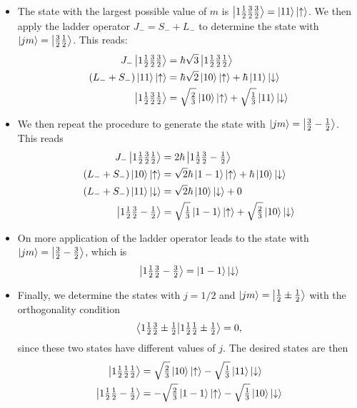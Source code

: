 \documentclass[11pt, a4paper]{article}
\newcommand{\ua}{\uparrow}  %
\newcommand{\da}{\downarrow}  %
\begin{document}
\begin{itemize}
    \item The state with the largest possible value of $ m $ is $ \ket{1 \tfrac{1}{2} \tfrac{3}{2} \tfrac{3}{2}} = \ket{11}\ket{\ua} $. We then apply the ladder operator $ J_{-} = S_{-} + L_{-} $ to determine the state with $ \ket{jm} = \ket{\tfrac{3}{2}\tfrac{1}{2}} $. This reads:
    \begin{align*}
        J_{-} \ket{1 \tfrac{1}{2} \tfrac{3}{2}\tfrac{3}{2}} &= \hbar \sqrt{3} \ket{1 \tfrac{1}{2} \tfrac{3}{2} \tfrac{1}{2}}\\
        (L_{-} + S_{-}) \ket{11}\ket{\ua} &= \hbar \sqrt{2} \ket{10}\ket{\ua} + \hbar \ket{11} \ket{\da}\\
        \ket{1 \tfrac{1}{2}\tfrac{3}{2}\tfrac{1}{2}} &= \sqrt{\tfrac{2}{3}}\ket{10}\ket{\ua} + \sqrt{\tfrac{1}{3}} \ket{11}\ket{\da}
    \end{align*}
    
    \item We then repeat the procedure to generate the state with $ \ket{jm} = \ket{\tfrac{3}{2}-\tfrac{1}{2}} $. This reads
    \begin{align*}
        J_{-}\ket{1 \tfrac{1}{2}\tfrac{3}{2}\tfrac{1}{2}} &= 2 \hbar \ket{1 \tfrac{1}{2}\tfrac{3}{2}-\tfrac{1}{2}}\\
        (L_{-} + S_{-})\ket{10}\ket{\ua} &= \sqrt{2}\hbar \ket{1-1}\ket{\ua} + \hbar \ket{10}\ket{\da}\\
        (L_{-} + S_{-}) \ket{11}\ket{\da} &= \sqrt{2}\hbar \ket{10}\ket{\da} + 0\\
        \ket{1 \tfrac{1}{2}\tfrac{3}{2}-\tfrac{1}{2}} & = \sqrt{\tfrac{1}{3}} \ket{1-1}\ket{\ua} + \sqrt{\tfrac{2}{3}} \ket{10}\ket{\da}
    \end{align*}

    \item On more application of the ladder operator leads to the state with $ \ket{jm} = \ket{\tfrac{3}{2}-\tfrac{3}{2}} $, which is
    \begin{equation*}
        \ket{1 \tfrac{1}{2}\tfrac{3}{2} -\tfrac{3}{2}} = \ket{1-1}\ket{\da}
    \end{equation*}
    
    \item Finally, we determine the states with $ j = 1/2 $ and $ \ket{jm} = \ket{\tfrac{1}{2} \pm \tfrac{1}{2}} $ with the orthogonality condition
    \begin{equation*}
        \braket{1 \tfrac{1}{2}\tfrac{3}{2}\pm \tfrac{1}{2}}{1 \tfrac{1}{2}\tfrac{1}{2}\pm \tfrac{1}{2}} = 0,
    \end{equation*}
    since these two states have different values of $ j $. The desired states are then
    \begin{align*}
        \ket{1 \tfrac{1}{2}\tfrac{1}{2}\tfrac{1}{2}} &= \sqrt{\tfrac{2}{3}}\ket{10} \ket{\ua} - \sqrt{\tfrac{1}{3}} \ket{11}\ket{\da}\\
        \ket{1 \tfrac{1}{2}\tfrac{1}{2}-\tfrac{1}{2}} &= -\sqrt{\tfrac{2}{3}}\ket{1-1} \ket{\ua} - \sqrt{\tfrac{1}{3}} \ket{10}\ket{\da}\\
    \end{align*}
\end{itemize}
\end{document}
